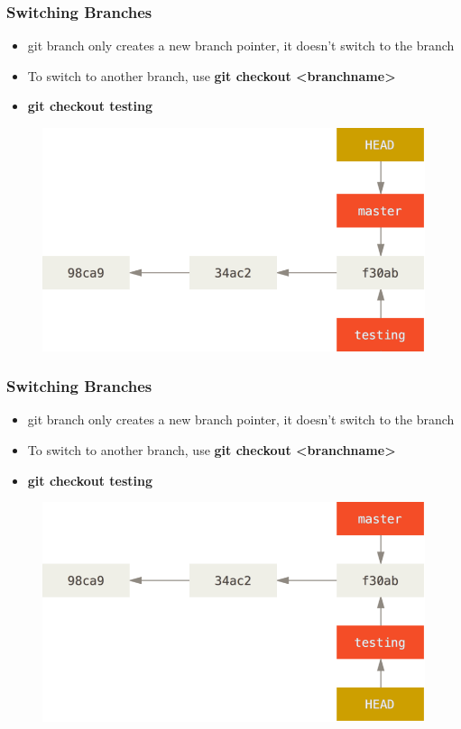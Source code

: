 \documentclass{beamer}
\begin{document}
\begin{frame}
	\frametitle{Switching Branches}
	\begin{itemize}
		\item{git branch only creates a new branch pointer, it doesn't switch to the branch}
		\item{To switch to another branch, use \textbf{git checkout \textless{}branchname\textgreater{}}}
		\item{\textbf{git checkout testing}}
	\end{itemize}
	\begin{figure}
		\includegraphics[scale=0.32]{Switching_Branches-0.png}
	\end{figure}
\end{frame}

\begin{frame}
	\frametitle{Switching Branches}
	\begin{itemize}
		\item{git branch only creates a new branch pointer, it doesn't switch to the branch}
		\item{To switch to another branch, use \textbf{git checkout \textless{}branchname\textgreater{}}}
		\item{\textbf{git checkout testing}}
	\end{itemize}
	\begin{figure}
		\includegraphics[scale=0.32]{Switching_Branches-1.png}
	\end{figure}
\end{frame}
\end{document}
